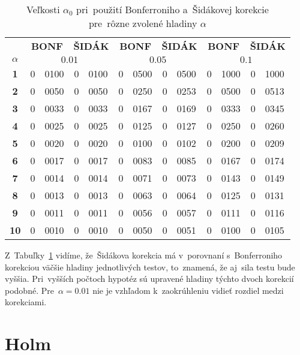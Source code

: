 \begin{table}[h!]
  \centering
  \begin{tabular}{c|r@{.}lr@{.}lr@{.}lr@{.}lr@{.}lr@{.}l}
     & \multicolumn{2}{c}{{\bf BONF}} & \multicolumn{2}{c}{{\bf ŠIDÁK}} 
     & \multicolumn{2}{c}{{\bf BONF}} & \multicolumn{2}{c}{{\bf ŠIDÁK}} 
     & \multicolumn{2}{c}{{\bf BONF}} & \multicolumn{2}{c}{{\bf ŠIDÁK}} \\ 
     {\bf $\alpha$} & \multicolumn{4}{c}{{\bf $0.01$}} & \multicolumn{4}{c}{{\bf $0.05$}} & \multicolumn{4}{c}{{\bf $0.1$}} \\ \hline
    {\bf 1} & 0&0100 & 0&0100 & 0&0500 & 0&0500 & 0&1000 & 0&1000 \\
    {\bf 2} & 0&0050 & 0&0050 & 0&0250 & 0&0253 & 0&0500 & 0&0513 \\
    {\bf 3} & 0&0033 & 0&0033 & 0&0167 & 0&0169 & 0&0333 & 0&0345 \\
    {\bf 4} & 0&0025 & 0&0025 & 0&0125 & 0&0127 & 0&0250 & 0&0260 \\
    {\bf 5} & 0&0020 & 0&0020 & 0&0100 & 0&0102 & 0&0200 & 0&0209 \\
    {\bf 6} & 0&0017 & 0&0017 & 0&0083 & 0&0085 & 0&0167 & 0&0174 \\
    {\bf 7} & 0&0014 & 0&0014 & 0&0071 & 0&0073 & 0&0143 & 0&0149 \\ 
    {\bf 8} & 0&0013 & 0&0013 & 0&0063 & 0&0064 & 0&0125 & 0&0131 \\ 
    {\bf 9} & 0&0011 & 0&0011 & 0&0056 & 0&0057 & 0&0111 & 0&0116 \\ 
    {\bf 10} & 0&0010 & 0&0010 & 0&0050 & 0&0051 & 0&0100 & 0&0105 \\ 
  \end{tabular}
  \caption{Veľkosti $\alpha_0$ pri~použití Bonferroniho a~Šidákovej korekcie 
  pre~rôzne zvolené hladiny $\alpha$}
  \captionsetup{justification=centering}
  \label{tab03:1}
\end{table}

Z~Tabuľky~\ref{tab03:1} vidíme, že~Šidákova korekcia má v~porovnaní s~Bonferroniho korekciou 
väčšie hladiny jednotlivých testov, to~znamená, že aj~sila testu bude vyššia. 
Pri~vyšších počtoch hypotéz sú upravené hladiny týchto dvoch korekcií podobné. 
Pre~$\alpha = 0.01$ nie je vzhľadom k~zaokrúhleniu vidieť rozdiel medzi korekciami. 

\section{Holm}

